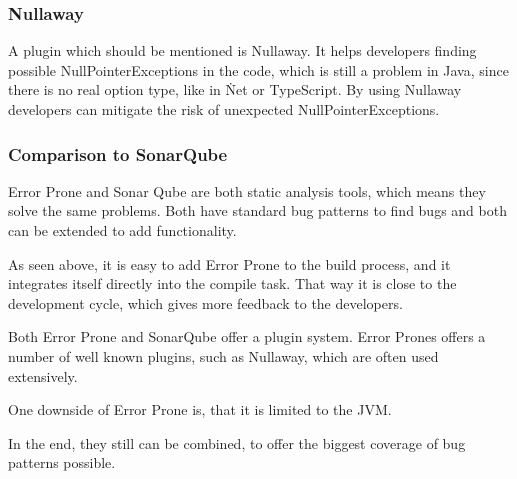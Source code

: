 \subsubsection{Nullaway}
A plugin which should be mentioned is Nullaway.
It helps developers finding possible NullPointerExceptions in the code, which is still a problem in Java, since there is no real option type, like in \.Net or TypeScript.
By using Nullaway developers can mitigate the risk of unexpected NullPointerExceptions.

\subsubsection{Comparison to SonarQube}
Error Prone and Sonar Qube are both static analysis tools, which means they solve the same problems.
Both have standard bug patterns to find bugs and both can be extended to add functionality.

As seen above, it is easy to add Error Prone to the build process, and it integrates itself directly into the compile task.
That way it is close to the development cycle, which gives more feedback to the developers.

Both Error Prone and SonarQube offer a plugin system.
Error Prones offers a number of well known plugins, such as Nullaway, which are often used extensively.

One downside of Error Prone is, that it is limited to the JVM.

In the end, they still can be combined, to offer the biggest coverage of bug patterns possible.
